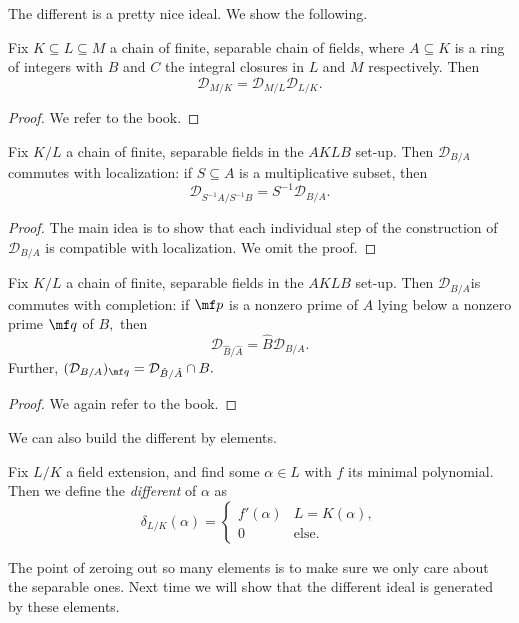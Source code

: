 \documentclass[../notes.tex]{subfiles}
\begin{document}
The different is a pretty nice ideal. We show the following.
\begin{definition}
	Fix $K\subseteq L\subseteq M$ a chain of finite, separable chain of fields, where $A\subseteq K$ is a ring of integers with $B$ and $C$ the integral closures in $L$ and $M$ respectively. Then
	\[\mathcal D_{M/K}=\mathcal D_{M/L}\mathcal D_{L/K}.\]
\end{definition}
\begin{proof}
	We refer to the book.
\end{proof}
\begin{prop}
	Fix $K/L$ a chain of finite, separable fields in the $AKLB$ set-up. Then $\mathcal D_{B/A}$ commutes with localization: if $S\subseteq A$ is a multiplicative subset, then 
	\[\mathcal D_{S^{-1}A/S^{-1}B}=S^{-1}\mathcal D_{B/A}.\]
\end{prop}
\begin{proof}
	The main idea is to show that each individual step of the construction of $\mathcal D_{B/A}$ is compatible with localization. We omit the proof.
\end{proof}
\begin{proposition}
	Fix $K/L$ a chain of finite, separable fields in the $AKLB$ set-up. Then $\mathcal D_{B/A}$is commutes with completion: if $\mf p$ is a nonzero prime of $A$ lying below a nonzero prime $\mf q$ of $B,$ then
	\[\mathcal D_{\hat B/\hat A}=\hat B\mathcal D_{B/A}.\]
	Further, $(\mathcal D_{B/A})_{\mf q}=\mathcal D_{\hat B/\hat A}\cap B.$
\end{proposition}
\begin{proof}
	We again refer to the book.
\end{proof}
We can also build the different by elements.
\begin{definition}
	Fix $L/K$ a field extension, and find some $\alpha\in L$ with $f$ its minimal polynomial. Then we define the \textit{different} of $\alpha$ as
	\[\delta_{L/K}(\alpha)=\begin{cases}
		f'(\alpha) & L=K(\alpha), \\
		0 & \text{else}.
	\end{cases}\]
\end{definition}
The point of zeroing out so many elements is to make sure we only care about the separable ones. Next time we will show that the different ideal is generated by these elements.
\end{document}
